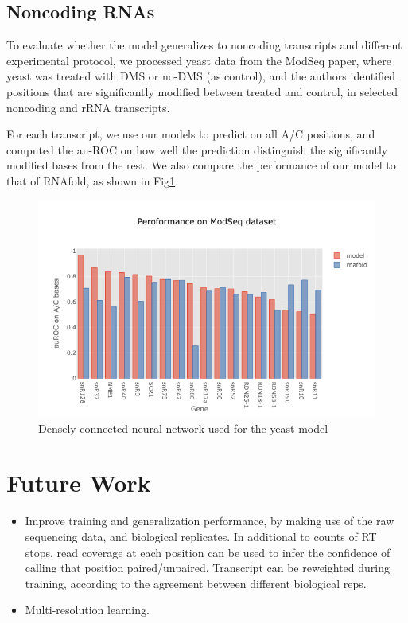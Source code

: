 \documentclass{proposal}
\begin{document}
\subsection{Noncoding RNAs}

To evaluate whether the model generalizes to noncoding transcripts and different experimental protocol,
we processed yeast data from the ModSeq paper\cite{talkish2014mod},
where yeast was treated with DMS or no-DMS (as control),
and the authors identified positions that are significantly modified between treated and control,
in selected noncoding and rRNA transcripts.

For each transcript, we use our models to predict on all A/C positions,
and computed the au-ROC on how well the prediction distinguish the significantly modified bases from the rest.
We also compare the performance of our model to that of RNAfold, as shown in Fig\ref{fig:yeast_modseq_performance}.

\begin{figure}[h!]
\includegraphics[width=\textwidth]{yeast_modseq_performance.png}
\caption{Densely connected neural network used for the yeast model}
\label{fig:yeast_modseq_performance}
\centering
\end{figure}


\section{Future Work}

\begin{itemize}
  \item Improve training and generalization performance, by making use of the raw sequencing data, and biological replicates.
  In additional to counts of RT stops, read coverage at each position can be used to infer the confidence of calling that position paired/unpaired.
  Transcript can be reweighted during training, according to the agreement between different biological reps.

  \item Multi-resolution learning. 
\end{itemize}
\end{document}
